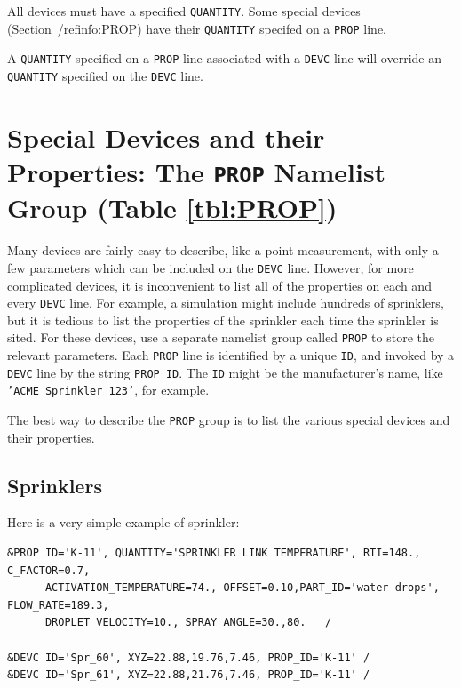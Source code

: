 \documentclass[11pt]{book}
\newcommand{\ct}{\tt\small}
\begin{document}
\begin{warning}
All devices must have a specified {\ct QUANTITY}.  Some special devices (Section~/ref{info:PROP}) have their {\ct QUANTITY}
specifed on a {\ct PROP} line.
\end{warning}

\begin{warning}
A {\ct QUANTITY} specified on a {\ct PROP} line associated with a {\ct DEVC} line will override an {\ct QUANTITY}
specified on the {\ct DEVC} line.
\end{warning}


\section{Special Devices and their Properties: The \texorpdfstring{{\tt PROP}}{PROP} Namelist Group (Table \ref{tbl:PROP})}
\label{info:PROP} 

Many devices are fairly easy to describe, like a point measurement, with only a few parameters which can be included on the
{\ct DEVC} line. However, for more complicated devices, it is inconvenient to list all of the properties on each and every
{\ct DEVC} line. For example, a simulation might include hundreds of sprinklers, but it is tedious to list the properties of the
sprinkler each time the sprinkler is sited. For these devices, use a separate namelist group called {\ct PROP} to store the relevant parameters.
Each {\ct PROP} line is identified by a unique {\ct ID}, and invoked by a {\ct DEVC} line by the string {\ct PROP\_ID}.
The {\ct ID} might be the manufacturer's
name, like {\ct 'ACME Sprinkler 123'}, for example.

The best way to describe the {\ct PROP} group is to list the various special devices and their properties.


\subsection{Sprinklers}
\label{info:sprinklers}
 

Here is a very simple example of sprinkler:

\footnotesize
\begin{verbatim}
&PROP ID='K-11', QUANTITY='SPRINKLER LINK TEMPERATURE', RTI=148., C_FACTOR=0.7,
      ACTIVATION_TEMPERATURE=74., OFFSET=0.10,PART_ID='water drops', FLOW_RATE=189.3,
      DROPLET_VELOCITY=10., SPRAY_ANGLE=30.,80.   /

&DEVC ID='Spr_60', XYZ=22.88,19.76,7.46, PROP_ID='K-11' /
&DEVC ID='Spr_61', XYZ=22.88,21.76,7.46, PROP_ID='K-11' /
\end{verbatim} \normalsize
\end{document}
